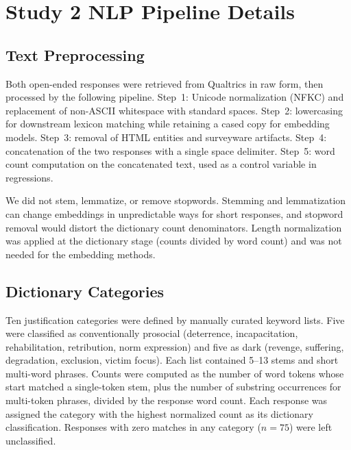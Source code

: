 \section{Study 2 NLP Pipeline Details}
\label{sec:supp_nlp_pipeline}

\subsection{Text Preprocessing}

Both open-ended responses were retrieved from Qualtrics in raw form, then processed by the following pipeline. Step~1: Unicode normalization (NFKC) and replacement of non-ASCII whitespace with standard spaces. Step~2: lowercasing for downstream lexicon matching while retaining a cased copy for embedding models. Step~3: removal of HTML entities and surveyware artifacts. Step~4: concatenation of the two responses with a single space delimiter. Step~5: word count computation on the concatenated text, used as a control variable in regressions.

We did not stem, lemmatize, or remove stopwords. Stemming and lemmatization can change embeddings in unpredictable ways for short responses, and stopword removal would distort the dictionary count denominators. Length normalization was applied at the dictionary stage (counts divided by word count) and was not needed for the embedding methods.

\subsection{Dictionary Categories}
\label{sec:supp_dict_contents}

Ten justification categories were defined by manually curated keyword lists. Five were classified as conventionally prosocial (deterrence, incapacitation, rehabilitation, retribution, norm expression) and five as dark (revenge, suffering, degradation, exclusion, victim focus). Each list contained 5--13 stems and short multi-word phrases. Counts were computed as the number of word tokens whose start matched a single-token stem, plus the number of substring occurrences for multi-token phrases, divided by the response word count. Each response was assigned the category with the highest normalized count as its dictionary classification. Responses with zero matches in any category ($n = 75$) were left unclassified.


